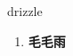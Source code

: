 
\begin{frame}
{\huge drizzle}
\begin{center}
\begin{enumerate}\Large
  \item \textbf{毛毛雨}
\end{enumerate}
\end{center}
\end{frame}
